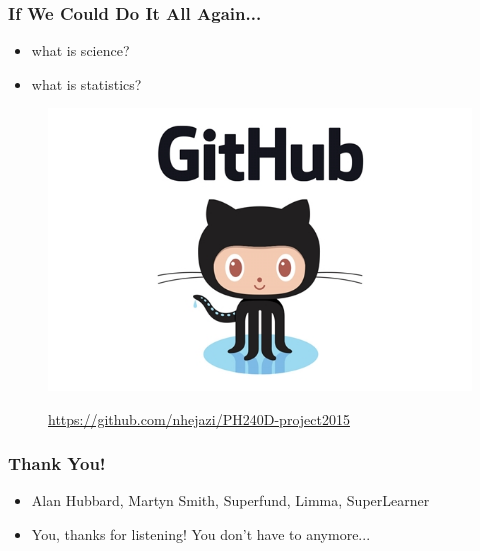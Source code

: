 \documentclass{beamer}
\begin{document}
\begin{frame}[fragile]
  	\frametitle{If We Could Do It All Again...}
		\begin{itemize}
			\item what is science?
			\item what is statistics?
		\end{itemize}
  		\begin{figure}
   			\href{https://github.com/nhejazi/PH240D-project2015}
         			{\includegraphics[scale=0.25]{../paper/figs/octocat.png}}
			\caption{\url{https://github.com/nhejazi/PH240D-project2015}}
      		\end{figure}
\end{frame}

\begin{frame}[fragile]
  	\frametitle{Thank You!}
		\begin{itemize}
			\item {Alan Hubbard, Martyn Smith, Superfund, Limma, SuperLearner}
			\item {You, thanks for listening! You don't have to anymore...}
		\end{itemize}
\end{frame}
\end{document}

